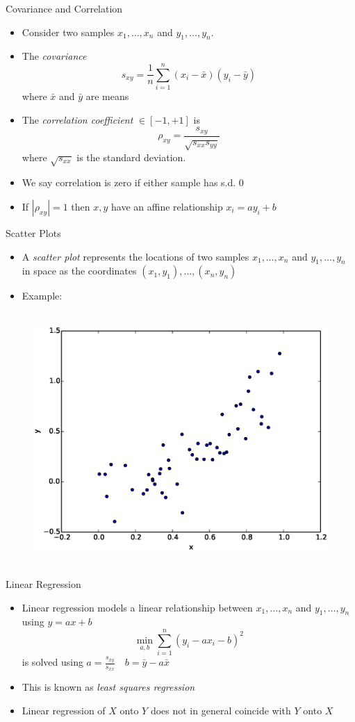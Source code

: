 \documentclass{beamer}
\begin{document}
\begin{frame}{Covariance and Correlation}
\begin{itemize} 
 \item Consider two samples $x_1, \ldots, x_n$ and $y_1, \ldots, y_n$. 
  \item The \emph{covariance}
 \begin{displaymath} 
  s_{xy} = \frac{1}{n} \sum_{i=1}^n (x_i - \bar{x})(y_i - \bar{y}) 
 \end{displaymath}
  where $\bar{x}$ and $\bar{y}$ are means 
 \item The \emph{correlation coefficient} $\in [-1, +1]$ is 
 \begin{displaymath}
  \rho_{xy} = \frac{s_{xy}}{\sqrt{s_{xx}s_{yy}}}
 \end{displaymath}
  where $\sqrt{s_{xx}}$ is the standard deviation. 
 \item We say correlation is zero if either sample has s.d. 0 
 \item If $|\rho_{xy}| = 1$ then $x, y$ have an affine relationship $x_i = a y_i + b$ 
\end{itemize}
\end{frame}

\begin{frame}{Scatter Plots} 
\begin{itemize}
 \item A \emph{scatter plot} represents the locations of two samples $x_1, \ldots, x_n$ and $y_1, \ldots, y_n$ in space as the coordinates $(x_1, y_1), \ldots, (x_n, y_n)$ 
 \item Example: 
\end{itemize}
  \begin{figure}[htp]
\mbox{
\includegraphics[width=0.5\linewidth]{ScatterPlot.eps}
}
\end{figure} 
\end{frame}

\begin{frame}{Linear Regression} 
\begin{itemize} 
 \item Linear regression models a linear relationship between $x_1, \ldots, x_n$ and $y_1, \ldots, y_n$ using $y = ax + b$ 
 \begin{displaymath} 
  \min_{a, b} \sum_{i=1}^n (y_i  - a x_i - b)^2 
 \end{displaymath}
 is solved using $a = \frac{s_{xy}}{s_{xx}} \quad b = \bar{y} - a\bar{x}$
 \item This is known as \emph{least squares regression}
\item Linear regression of $X$ onto $Y$ does not in general coincide with $Y$ onto $X$ 
 \end{itemize}
\end{frame}
\end{document}
